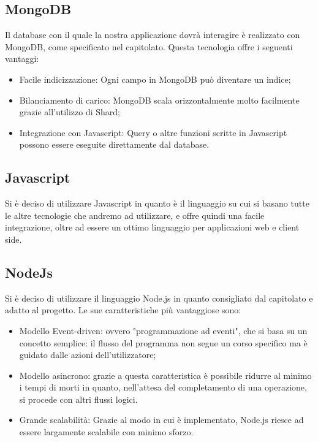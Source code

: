 \subsection{MongoDB}
Il database con il quale la nostra applicazione dovrà interagire è realizzato con MongoDB, come specificato nel capitolato. Questa tecnologia offre i seguenti vantaggi:
\begin{itemize}
\item Facile indicizzazione: Ogni campo in MongoDB può diventare un indice;
\item Bilanciamento di carico: MongoDB scala orizzontalmente molto facilmente grazie all'utilizzo di Shard;
\item Integrazione con Javascript: Query o altre funzioni scritte in Javascript possono essere eseguite direttamente dal database.
\end{itemize}

\subsection{Javascript}
Si è deciso di utilizzare Javascript in quanto è il linguaggio su cui si basano tutte le altre tecnologie che andremo ad utilizzare, e offre quindi una facile integrazione, oltre ad essere un ottimo linguaggio per applicazioni web e client side.

\subsection{NodeJs}
Si è deciso di utilizzare il linguaggio Node.js in quanto consigliato dal capitolato e adatto al progetto. Le sue caratteristiche più vantaggiose sono:
\begin{itemize}
\item Modello Event-driven: ovvero "programmazione ad eventi", che si basa su un concetto semplice: il flusso del programma non segue un corso specifico ma è guidato dalle azioni dell'utilizzatore;
\item Modello asincrono: grazie a questa caratteristica è possibile ridurre al minimo i tempi di morti in quanto, nell'attesa del completamento di una operazione, si procede con altri flussi logici. 
\item Grande scalabilità: Grazie al modo in cui è implementato, Node.js riesce ad essere largamente scalabile con minimo sforzo.
\end{itemize}

